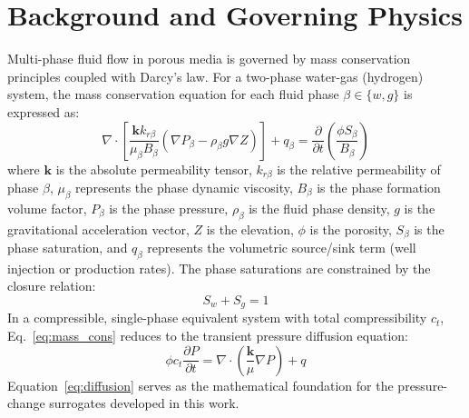\documentclass[10pt,twocolumn]{article}
\begin{document}
\section{Background and Governing Physics}
Multi-phase fluid flow in porous media is governed by mass conservation principles coupled with Darcy's law. For a two-phase water-gas (hydrogen) system, the mass conservation equation for each fluid phase $\beta \in \{w, g\}$ is expressed as:
\begin{equation}
\label{eq:mass_cons}
\nabla \cdot \left[ \frac{\mathbf{k} k_{r\beta}}{\mu_\beta B_\beta} (\nabla P_\beta - \rho_\beta g \nabla Z) \right] + q_\beta = \frac{\partial}{\partial t} \left( \frac{\phi S_\beta}{B_\beta} \right)
\end{equation}
where $\mathbf{k}$ is the absolute permeability tensor, $k_{r\beta}$ is the relative permeability of phase $\beta$, $\mu_\beta$ represents the phase dynamic viscosity, $B_\beta$ is the phase formation volume factor, $P_\beta$ is the phase pressure, $\rho_\beta$ is the fluid phase density, $g$ is the gravitational acceleration vector, $Z$ is the elevation, $\phi$ is the porosity, $S_\beta$ is the phase saturation, and $q_\beta$ represents the volumetric source/sink term (well injection or production rates). The phase saturations are constrained by the closure relation:
\begin{equation}
\label{eq:saturation_constraint}
S_w + S_g = 1
\end{equation}
In a compressible, single-phase equivalent system with total compressibility $c_t$, Eq.~\ref{eq:mass_cons} reduces to the transient pressure diffusion equation:
\begin{equation}
\label{eq:diffusion}
\phi c_t \frac{\partial P}{\partial t} = \nabla \cdot \left( \frac{\mathbf{k}}{\mu} \nabla P \right) + q
\end{equation}
Equation~\ref{eq:diffusion} serves as the mathematical foundation for the pressure-change surrogates developed in this work.
\end{document}
